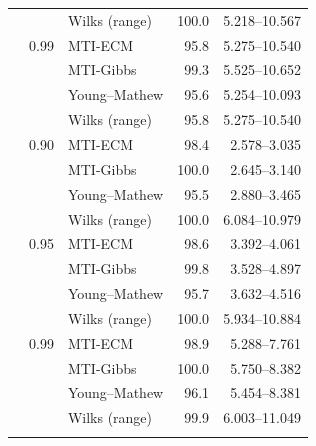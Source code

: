 \begin{longtable}{@{}rrlrr@{}}
 &  & Wilks (range) & 100.0 & 5.218--10.567 \\
\addlinespace[0.3em]
500 & 0.99 & MTI-ECM & 95.8 & 5.275--10.540 \\
 &  & MTI-Gibbs & 99.3 & 5.525--10.652 \\
 &  & Young--Mathew & 95.6 & 5.254--10.093 \\
 &  & Wilks (range) & 95.8 & 5.275--10.540 \\
\addlinespace[0.3em]
1000 & 0.90 & MTI-ECM & 98.4 & 2.578--3.035 \\
 &  & MTI-Gibbs & 100.0 & 2.645--3.140 \\
 &  & Young--Mathew & 95.5 & 2.880--3.465 \\
 &  & Wilks (range) & 100.0 & 6.084--10.979 \\
\addlinespace[0.3em]
1000 & 0.95 & MTI-ECM & 98.6 & 3.392--4.061 \\
 &  & MTI-Gibbs & 99.8 & 3.528--4.897 \\
 &  & Young--Mathew & 95.7 & 3.632--4.516 \\
 &  & Wilks (range) & 100.0 & 5.934--10.884 \\
\addlinespace[0.3em]
1000 & 0.99 & MTI-ECM & 98.9 & 5.288--7.761 \\
 &  & MTI-Gibbs & 100.0 & 5.750--8.382 \\
 &  & Young--Mathew & 96.1 & 5.454--8.381 \\
 &  & Wilks (range) & 99.9 & 6.003--11.049 \\
\addlinespace[0.3em]
\end{longtable}
\clearpage
